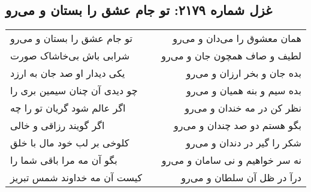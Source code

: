 \begin{center}
\section*{غزل شماره ۲۱۷۹: تو جام عشق را بستان و می‌رو}
\label{sec:2179}
\begin{longtable}{l p{0.5cm} r}
تو جام عشق را بستان و می‌رو
&&
همان معشوق را می‌دان و می‌رو
\\
شرابی باش بی‌خاشاک صورت
&&
لطیف و صاف همچون جان و می‌رو
\\
یکی دیدار او صد جان به ارزد
&&
بده جان و بخر ارزان و می‌رو
\\
چو دیدی آن چنان سیمین بری را
&&
بده سیم و بنه همیان و می‌رو
\\
اگر عالم شود گریان تو را چه
&&
نظر کن در مه خندان و می‌رو
\\
اگر گویند رزاقی و خالی
&&
بگو هستم دو صد چندان و می‌رو
\\
کلوخی بر لب خود مال با خلق
&&
شکر را گیر در دندان و می‌رو
\\
بگو آن مه مرا باقی شما را
&&
نه سر خواهیم و نی سامان و می‌رو
\\
کیست آن مه خداوند شمس تبریز
&&
درآ در ظل آن سلطان و می‌رو
\\
\end{longtable}
\end{center}

